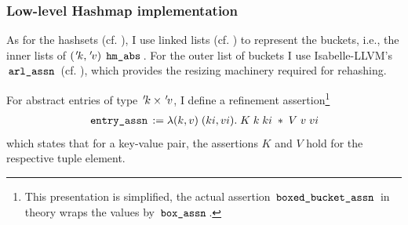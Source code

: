 \subsubsection{Low-level Hashmap implementation}\label{sec:low-level-hashmap-implementation}

As for the hashsets (cf. ), I use linked lists (cf. ) to represent the buckets, i.e., the inner lists of $({\mskip2mu '\mskip-2muk},{\mskip2mu '\mskip-2muv}) \; \,\text{\ttfamily hm\_abs}\,$.
For the outer list of buckets I use Isabelle-LLVM's $\,\text{\ttfamily arl\_assn}\,$ (cf. ), which provides the resizing machinery required for rehashing.

For abstract entries of type ${\mskip2mu '\mskip-2muk} \times {\mskip2mu '\mskip-2muv}$, I define a refinement assertion\footnote{This presentation is simplified, the actual assertion $\,\text{\ttfamily boxed\_bucket\_assn}\,$ in theory  wraps the values by $\,\text{\ttfamily box\_assn}\,$.}
\begin{gather*}
	\,\text{\ttfamily entry\_assn}\, := \lambda (k,v) \; (ki,vi). \; K \; k \; ki \; \ast \; V \; v \; vi
\end{gather*}
which states that for a key-value pair, the assertions $K$ and $V$ hold for the respective tuple element.

